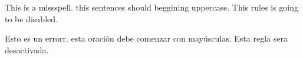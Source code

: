 \documentclass{article}
\begin{document}
This is a missspell.
this sentences should beggining uppercase.
This rules is going to be disabled.

Esto es un errorr.
esta oración debe comenzar con mayúsculas.
Esta regla sera desactivada.
\end{document}
